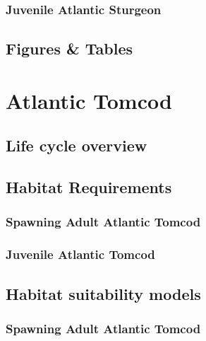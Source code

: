 \documentclass[
]{book}
\begin{document}
\hypertarget{juvenile-atlantic-sturgeon-1}{%
\subsection{Juvenile Atlantic Sturgeon}\label{juvenile-atlantic-sturgeon-1}}

\hypertarget{figures-tables-4}{%
\section{Figures \& Tables}\label{figures-tables-4}}

\hypertarget{atlantic-tomcod}{%
\chapter{Atlantic Tomcod}\label{atlantic-tomcod}}

\hypertarget{life-cycle-overview-5}{%
\section{Life cycle overview}\label{life-cycle-overview-5}}

\hypertarget{habitat-requirements-5}{%
\section{Habitat Requirements}\label{habitat-requirements-5}}

\hypertarget{spawning-adult-atlantic-tomcod}{%
\subsection{Spawning Adult Atlantic Tomcod}\label{spawning-adult-atlantic-tomcod}}

\hypertarget{juvenile-atlantic-tomcod}{%
\subsection{Juvenile Atlantic Tomcod}\label{juvenile-atlantic-tomcod}}

\hypertarget{habitat-suitability-models-5}{%
\section{Habitat suitability models}\label{habitat-suitability-models-5}}

\hypertarget{spawning-adult-atlantic-tomcod-1}{%
\subsection{Spawning Adult Atlantic Tomcod}\label{spawning-adult-atlantic-tomcod-1}}
\end{document}
